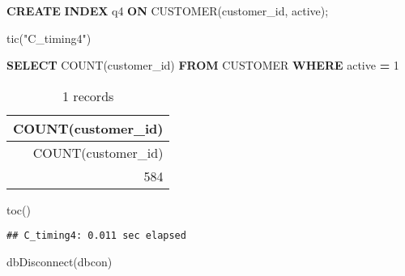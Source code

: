 \documentclass[
]{article}
\newenvironment{Shaded}{\begin{snugshade}}{\end{snugshade}}
\newcommand{\DecValTok}[1]{\textcolor[rgb]{0.00,0.00,0.81}{#1}}
\newcommand{\FunctionTok}[1]{\textcolor[rgb]{0.00,0.00,0.00}{#1}}
\newcommand{\KeywordTok}[1]{\textcolor[rgb]{0.13,0.29,0.53}{\textbf{#1}}}
\newcommand{\NormalTok}[1]{#1}
\newcommand{\OperatorTok}[1]{\textcolor[rgb]{0.81,0.36,0.00}{\textbf{#1}}}
\newcommand{\StringTok}[1]{\textcolor[rgb]{0.31,0.60,0.02}{#1}}
\begin{document}
\begin{Shaded}
\begin{Highlighting}[]
\KeywordTok{CREATE} \KeywordTok{INDEX}\NormalTok{ q4}
\KeywordTok{ON}\NormalTok{ CUSTOMER(customer\_id, active);}
\end{Highlighting}
\end{Shaded}

\begin{Shaded}
\begin{Highlighting}[]
\FunctionTok{tic}\NormalTok{(}\StringTok{"C\_timing4"}\NormalTok{)}
\end{Highlighting}
\end{Shaded}

\begin{Shaded}
\begin{Highlighting}[]
\KeywordTok{SELECT} \FunctionTok{COUNT}\NormalTok{(customer\_id)}
\KeywordTok{FROM}\NormalTok{ CUSTOMER}
\KeywordTok{WHERE}\NormalTok{ active }\OperatorTok{=} \DecValTok{1}
\end{Highlighting}
\end{Shaded}

\begin{longtable}[]{@{}r@{}}
\caption{1 records}\tabularnewline
\toprule
COUNT(customer\_id) \\
\midrule
\endfirsthead
\toprule
COUNT(customer\_id) \\
\midrule
\endhead
584 \\
\bottomrule
\end{longtable}

\begin{Shaded}
\begin{Highlighting}[]
\FunctionTok{toc}\NormalTok{()}
\end{Highlighting}
\end{Shaded}

\begin{verbatim}
## C_timing4: 0.011 sec elapsed
\end{verbatim}

\begin{Shaded}
\begin{Highlighting}[]
\FunctionTok{dbDisconnect}\NormalTok{(dbcon)}
\end{Highlighting}
\end{Shaded}
\end{document}
